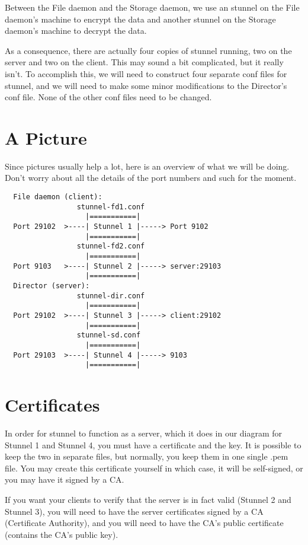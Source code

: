 Between the File daemon and the Storage daemon, we use an stunnel on the File
daemon's machine to encrypt the data and another stunnel on the Storage
daemon's machine to decrypt the data. 

As a consequence, there are actually four copies of stunnel running, two on the
server and two on the client. This may sound a bit complicated, but it really
isn't. To accomplish this, we will need to construct four separate conf files
for stunnel, and we will need to make some minor modifications to the
Director's conf file. None of the other conf files need to be changed. 

\section{A Picture}

Since pictures usually help a lot, here is an overview of what we will be
doing. Don't worry about all the details of the port numbers and such for the
moment. 

\footnotesize
\begin{verbatim}
  File daemon (client):
                 stunnel-fd1.conf
                   |===========|
  Port 29102  >----| Stunnel 1 |-----> Port 9102
                   |===========|
                 stunnel-fd2.conf
                   |===========|
  Port 9103   >----| Stunnel 2 |-----> server:29103
                   |===========|
  Director (server):
                 stunnel-dir.conf
                   |===========|
  Port 29102  >----| Stunnel 3 |-----> client:29102
                   |===========|
                 stunnel-sd.conf
                   |===========|
  Port 29103  >----| Stunnel 4 |-----> 9103
                   |===========|
\end{verbatim}
\normalsize

\section{Certificates}

In order for stunnel to function as a server, which it does in our diagram for
Stunnel 1 and Stunnel 4, you must have a certificate and the key. It is
possible to keep the two in separate files, but normally, you keep them in one
single .pem file. You may create this certificate yourself in which case, it
will be self-signed, or you may have it signed by a CA. 

If you want your clients to verify that the server is in fact valid (Stunnel 2
and Stunnel 3), you will need to have the server certificates signed by a CA
(Certificate Authority), and you will need to have the CA's public certificate
(contains the CA's public key). 

